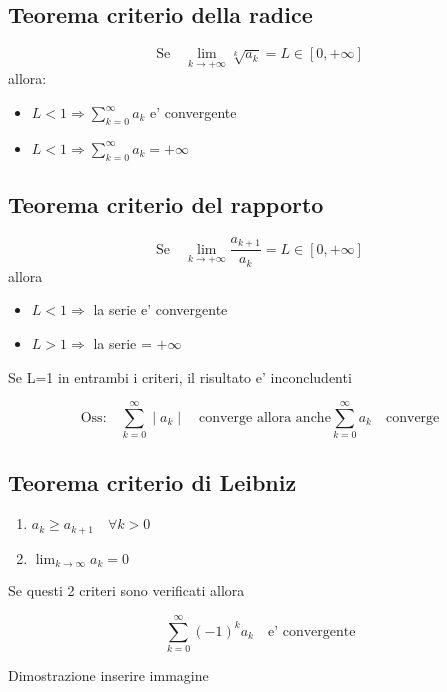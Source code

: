 \documentclass{article}
\begin{document}
          \subsection{Teorema criterio della radice}
          \begin{equation*}
            \text{Se} \quad \lim_{k\to +\infty} \sqrt[k]{a_k}=L \in [0,+\infty]
          \end{equation*}
          allora:
          \begin{itemize}
            \item $L<1 \Rightarrow \sum^{\infty}_{k=0} a_k$ e' convergente 
            \item $L<1 \Rightarrow \sum^{\infty}_{k=0} a_k=+\infty$
          \end{itemize}
          \subsection{Teorema criterio del rapporto}
          \begin{equation*}
            \text{Se} \quad \lim_{k\to +\infty} \frac{a_{k+1}}{a_k}=L \in [0,+\infty]
          \end{equation*}
          allora
          \begin{itemize}
            \item $L<1 \Rightarrow$ la serie e' convergente 
            \item $L>1 \Rightarrow$ la serie  = $+\infty$
          \end{itemize}
          \begin{flushleft}
            Se L=1 in entrambi i criteri, il risultato e' inconcludenti
          \end{flushleft}
          \begin{equation*} 
            \text{Oss:} \quad \sum^{\infty}_{k=0} \mid a_k \mid \quad \text{converge allora anche} \sum^{\infty}_{k=0} a_k \quad \text{converge}
          \end{equation*}
          \subsection{Teorema criterio di Leibniz}
          \begin{enumerate}
            \item $a_k \geq a_{k+1} \quad \forall k>0$
            \item $\lim_{k\to \infty} a_k=0$
          \end{enumerate}
          \begin{flushleft}
           Se questi 2 criteri sono verificati allora 
          \end{flushleft}
          \begin{equation*}
            \sum^{\infty}_{k=0} (-1)^ka_k \quad \text{e' convergente}
          \end{equation*}
          \begin{flushleft}
            Dimostrazione inserire immagine
          \end{flushleft}
          
      
\end{document}
